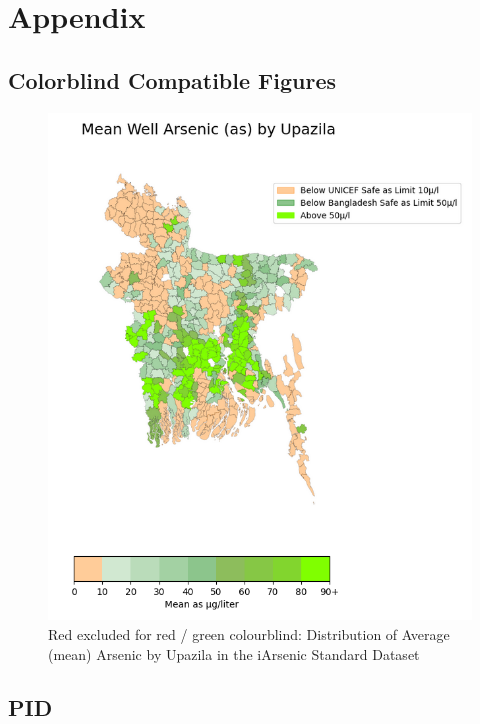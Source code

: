 \documentclass[bsc]{abdnthesis}
\begin{document}







%

\newpage
{}
{}
\printbibliography


\appendix

\chapter{Appendix}

\section{Colorblind Compatible Figures}

\begin{figure}[!htb]
    \centering
    \includegraphics[scale=0.6]{appendix/cblind_as_by_upa.png} 
    \caption{Red excluded for red / green colourblind: Distribution of Average (mean) Arsenic by Upazila in the iArsenic Standard Dataset}
    \label{fig:x avg_as_cblind}
\end{figure}

\section{PID}


\end{document}
